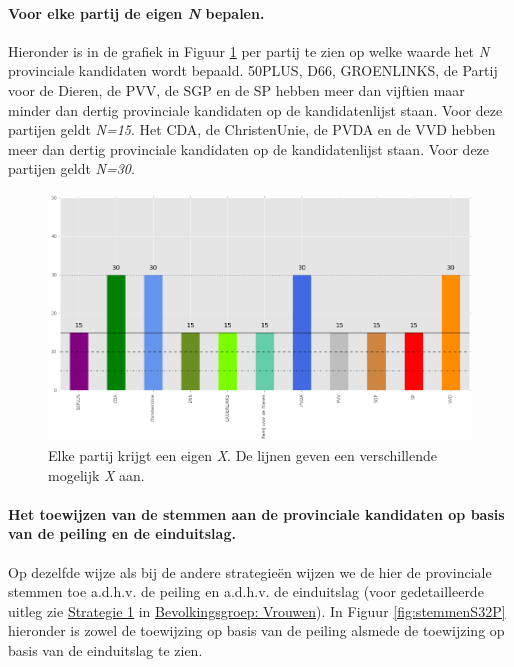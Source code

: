 \paragraph{Voor elke partij de eigen \textit{N} bepalen.}
Hieronder is in de grafiek in Figuur \ref{fig:XP} per partij te zien op welke waarde het \textit{N} provinciale kandidaten wordt bepaald. 50PLUS, D66, GROENLINKS, de Partij voor de Dieren, de PVV, de SGP en de SP hebben meer dan vijftien maar minder dan dertig provinciale kandidaten op de kandidatenlijst staan. Voor deze partijen geldt \textit{N=15}. Het CDA, de ChristenUnie, de PVDA en de VVD hebben meer dan dertig provinciale kandidaten op de kandidatenlijst staan. Voor deze partijen geldt \textit{N=30}.

\begin{figure}[H]

	\includegraphics[width=\linewidth]{eigenX_partijen_provincialen.png}

			\caption{Elke partij krijgt een eigen \textit{X}. De lijnen geven een verschillende mogelijk \textit{X} aan.} 

\label{fig:XP}
\end{figure}


\paragraph{Het toewijzen van de stemmen aan de provinciale kandidaten op basis van de peiling en de einduitslag.}
Op dezelfde wijze als bij de andere strategie\"{e}n wijzen we de hier de provinciale stemmen toe a.d.h.v. de peiling en a.d.h.v. de einduitslag (voor gedetailleerde uitleg zie \hyperref[S1V]{Strategie 1} in \hyperref[vrouwen]{Bevolkingsgroep: Vrouwen}). In Figuur \ref{fig:stemmenS32P} hieronder is zowel de toewijzing op basis van de peiling alsmede de toewijzing op basis van de einduitslag te zien.


